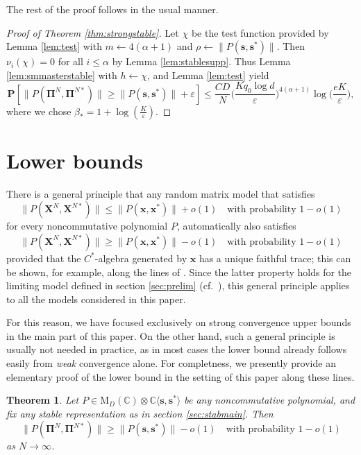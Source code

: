 \documentclass[10pt,reqno]{amsart}
\newtheorem{thm}{Theorem}[section]
\theoremstyle{definition}
\theoremstyle{remark}
\numberwithin{equation}{section}
\numberwithin{figure}{section}
\numberwithin{table}{section}
\begin{document}
The rest of the proof follows in the usual manner.

\begin{proof}[Proof of Theorem \ref{thm:strongstable}]
Let $\chi$ be the test function provided by Lemma
\ref{lem:test} with $m\leftarrow 4(\alpha+1)$ and
$\rho\leftarrow \|P(\boldsymbol{s},\boldsymbol{s}^*)\|$. Then 
$\nu_i(\chi)=0$ for all $i\le \alpha$ by
Lemma \ref{lem:stablesupp}. Thus Lemma
\ref{lem:smmasterstable} with $h\leftarrow\chi$, 
and Lemma \ref{lem:test} yield
$$
	\mathbf{P}[\|P(\boldsymbol{\Pi}^N,\boldsymbol{\Pi}^{N*})\| \ge
	\|P(\boldsymbol{s},\boldsymbol{s}^*)\|+\varepsilon] \le
	\frac{CD}{N}
	\bigg(\frac{Kq_0\log d}{\varepsilon}\bigg)^{4(\alpha+1)}
        \log
	\bigg(\frac{eK}{\varepsilon}\bigg),
$$
where we chose $\beta_*=1+\log(\frac{K}{\varepsilon})$.
\end{proof}


\appendix

\section{Lower bounds}
\label{sec:lowerbd}

There is a general principle that any random matrix model that satisfies
$$
	\|P(\boldsymbol{X}^N,\boldsymbol{X}^{N*})\| \le
	\|P(\boldsymbol{x},\boldsymbol{x}^*)\| + o(1)
	\quad\text{with probability }1-o(1)
$$
for every noncommutative polynomial $P$, automatically also 
satisfies
$$
	\|P(\boldsymbol{X}^N,\boldsymbol{X}^{N*})\| \ge
	\|P(\boldsymbol{x},\boldsymbol{x}^*)\| - o(1)
	\quad\text{with probability }1-o(1)
$$
provided that the $C^*$-algebra generated by $\boldsymbol{x}$ has a unique 
faithful trace; this can be shown, for example, along the lines of 
\cite[pp.\ 16--19]{LM23}. Since the latter property holds for the limiting 
model defined in section \ref{sec:prelim} (cf.\ \cite{Pow75}), this 
general principle applies to all the models considered in this paper.

For this reason, we have focused exclusively on strong convergence upper 
bounds in the main part of this paper. On the other hand, such a general 
principle is usually not needed in practice, as in most cases the lower 
bound already follows easily from \emph{weak} convergence alone.
For completness, we presently provide an elementary proof of the lower 
bound in the setting of this paper along these lines.

\begin{thm}
\label{thm:lowerstable}
Let $P\in \mathrm{M}_D(\mathbb{C})
\otimes \mathbb{C}\langle\boldsymbol{s},\boldsymbol{s}^*\rangle$ be any
noncommutative polynomial, and fix any stable representation as in section
\ref{sec:stabmain}. Then
$$
        \|P(\boldsymbol{\Pi}^N,\boldsymbol{\Pi}^{N*})\|\ge
        \|P(\boldsymbol{s},\boldsymbol{s}^*)\|-o(1)
        \quad\text{with probability }1-o(1)
$$
as $N\to\infty$.
\end{thm}
\end{document}

